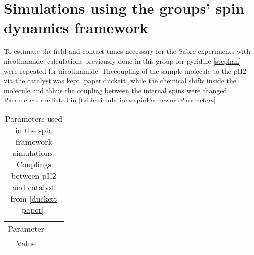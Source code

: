     \section{Simulations using the groups' spin dynamics framework}
        To estimate the field and contact times necessary for the Sabre experiments with nicotinamide, calculations previously done in this group for pyridine \ref{stephan} were repeated for nicotinamide. Thecoupling of the sample molecule to the pH2 via the catalyst was kept \ref{paper duckett} while the chemical shifts inside the molecule and thhus the coupling between the internal spins were changed. Parameters are listed in \ref{table:simulations:spinFrameworkParameters}
        \begin{table}
        \centering
            \begin{tabular}{ccc}
                Parameter & \\
                Value & 
            \end{tabular}
            \caption[Spin framework parameters]{Parameters used in the spin framework simulations. Couplings between pH2 and catalyst from \ref{duckett paper}. }
        \end{table}
